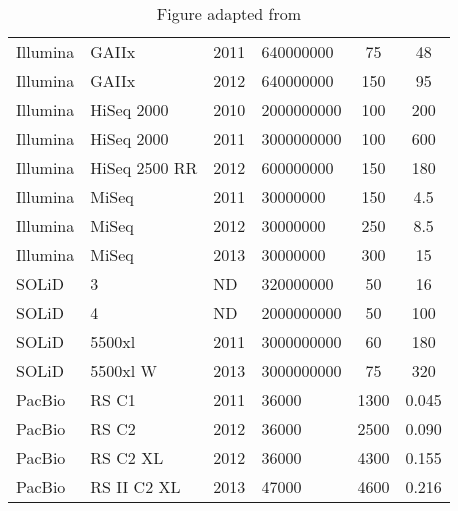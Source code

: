 \begin{table}[t]
{\begin{tabular}{llllcc}
Illumina   & GAIIx           & 2011 & 640000000     & 75                            & 48                        \\
Illumina   & GAIIx           & 2012 & 640000000     & 150                           & 95                        \\
Illumina   & HiSeq 2000      & 2010 & 2000000000    & 100                           & 200                       \\
Illumina   & HiSeq 2000      & 2011 & 3000000000    & 100                           & 600                       \\
Illumina   & HiSeq 2500 RR   & 2012 & 600000000     & 150                           & 180                       \\
Illumina   & MiSeq           & 2011 & 30000000      & 150                           & 4.5                       \\
Illumina   & MiSeq           & 2012 & 30000000      & 250                           & 8.5                       \\
Illumina   & MiSeq           & 2013 & 30000000      & 300                           & 15                        \\
SOLiD      & 3               & ND   & 320000000     & 50                            & 16                        \\
SOLiD      & 4               & ND   & 2000000000    & 50                            & 100                       \\
SOLiD      & 5500xl          & 2011 & 3000000000    & 60                            & 180                       \\
SOLiD      & 5500xl W        & 2013 & 3000000000    & 75                            & 320                       \\
PacBio     & RS C1           & 2011 & 36000         & 1300                          & 0.045                     \\
PacBio     & RS C2           & 2012 & 36000         & 2500                          & 0.090                     \\
PacBio     & RS C2 XL        & 2012 & 36000         & 4300                          & 0.155                     \\
PacBio     & RS II C2 XL     & 2013 & 47000         & 4600                          & 0.216                    \\
\bottomrule
\end{tabular}}
\caption[Current HTS Sequencing Platforms]{Figure adapted from \citep{developmentinNGS:2012bs}}
\label{tab:table3_1}
\end{table}